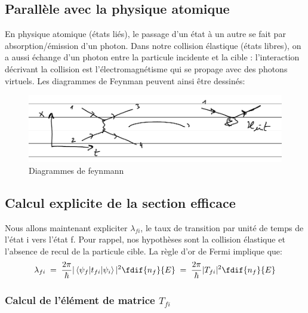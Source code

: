 \subsection{Parallèle avec la physique atomique}

En physique atomique (états liés), le passage d'un état à un autre se fait par absorption/émission d'un photon. Dans notre collision élastique (états libres), on a aussi échange d'un photon entre la particule incidente et la cible : l'interaction décrivant la collision est l'électromagnétisme qui se propage avec des photons virtuels. Les diagrammes de Feynman peuvent ainsi être dessinés:
 \begin{figure}[H]
    \centering
    \includegraphics[scale=0.80]{Images4/partie 4 - interaction.PNG}
    \caption{Diagrammes de feynmann}
    \label{fig:feynmann_diagram}
\end{figure}



\subsection{Calcul explicite de la section efficace}


Nous allons maintenant expliciter $\lambda_{fi}$, le taux de transition par unité de temps de l'état i vers l'état f. Pour rappel, nos hypothèses sont la collision élastique et l'absence de recul de la particule cible. La règle d'or de Fermi implique que:
\begin{equation*}
  \lambda_{fi} 
  \eq
  \dfrac{2\pi}{\hbar }|\mel{\psi_f}{t_{fi}}{\psi_i}|^2 \fdif{n_f}{E}
  \eq
  \dfrac{2\pi}{\hbar }|T_{fi}|^2 \fdif{n_f}{E}
\end{equation*}

\subsubsection{Calcul de l'élément de matrice $T_{fi}$}\label{calcul_Tfi}

